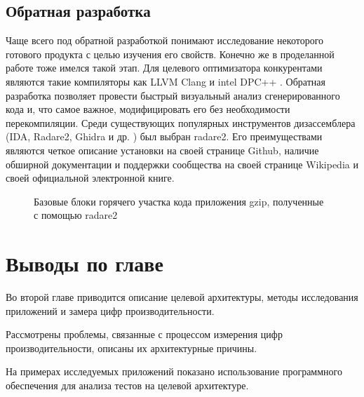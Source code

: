 \subsection{Обратная разработка}\label{p1:optop:reverse}

Чаще всего под обратной разработкой понимают исследование некоторого готового продукта с целью изучения его свойств. Конечно же в проделанной работе тоже имелся такой этап. Для целевого оптимизатора конкурентами являются такие компиляторы как LLVM Clang \cite{lattner2008llvm} и intel DPC++ \cite{castano2022evaluation}. Обратная разработка позволяет провести быстрый визуальный анализ сгенерированного кода и, что самое важное,  модифицировать его без необходимости перекомпиляции. Среди существующих популярных инструментов дизассемблера (IDA, Radare2, Ghidra и др. \cite{ferguson2008reverse, mester2023malware, jiang2022comprehensive}) был выбран radare2. Его преимуществами являются четкое описание установки на своей странице Github, наличие обширной документации и поддержки сообщества на своей странице Wikipedia и своей официальной электронной книге.

\begin{figure}[htbp]
	\centering
	
	\caption{Базовые блоки горячего участка кода приложения gzip, полученные с помощью radare2}
	\label{radare2}
\end{figure}

\section{Выводы по главе}

Во второй главе приводится описание целевой архитектуры,  методы исследования приложений и замера цифр производительности. 

Рассмотрены проблемы, связанные с процессом измерения цифр производительности, описаны их архитектурные причины.

На примерах исследуемых приложений показано использование программного обеспечения для анализа тестов на целевой архитектуре.




